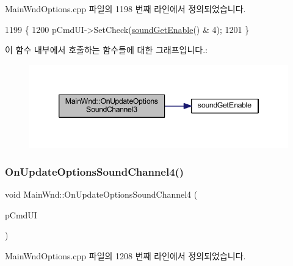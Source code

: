 Main\+Wnd\+Options.\+cpp 파일의 1198 번째 라인에서 정의되었습니다.


\begin{DoxyCode}
1199 \{
1200   pCmdUI->SetCheck(\mbox{\hyperlink{_sound_8cpp_a3d1f6129176583804274bb162c3428a8}{soundGetEnable}}() & 4);
1201 \}
\end{DoxyCode}
이 함수 내부에서 호출하는 함수들에 대한 그래프입니다.\+:
\nopagebreak
\begin{figure}[H]
\begin{center}
\leavevmode
\includegraphics[width=346pt]{class_main_wnd_a9dbf1190b86d5962ea43afb16fb48559_cgraph}
\end{center}
\end{figure}
\mbox{\label{class_main_wnd_aafd7a1e3f482022ffbb6731f02de0ee1}} 
\subsubsection{\texorpdfstring{On\+Update\+Options\+Sound\+Channel4()}{OnUpdateOptionsSoundChannel4()}}
{\footnotesize\ttfamily void Main\+Wnd\+::\+On\+Update\+Options\+Sound\+Channel4 (\begin{DoxyParamCaption}\item[{C\+Cmd\+UI $\ast$}]{p\+Cmd\+UI }\end{DoxyParamCaption})\hspace{0.3cm}{\ttfamily [protected]}}



Main\+Wnd\+Options.\+cpp 파일의 1208 번째 라인에서 정의되었습니다.



